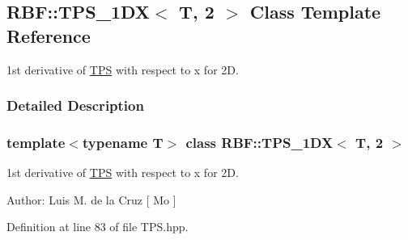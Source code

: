 \hypertarget{classRBF_1_1TPS__1DX_3_01T_00_012_01_4}{
\subsection{RBF::TPS\_\-1DX$<$ T, 2 $>$ Class Template Reference}
\label{classRBF_1_1TPS__1DX_3_01T_00_012_01_4}
}
1st derivative of \hyperlink{classRBF_1_1TPS}{TPS} with respect to x for 2D.  




\subsubsection{Detailed Description}
\subsubsection*{template$<$typename T$>$ class RBF::TPS\_\-1DX$<$ T, 2 $>$}

1st derivative of \hyperlink{classRBF_1_1TPS}{TPS} with respect to x for 2D. 

\begin{Desc}
\item[Author:]Luis M. de la Cruz \mbox{[} Mo \mbox{]} \end{Desc}


Definition at line 83 of file TPS.hpp.